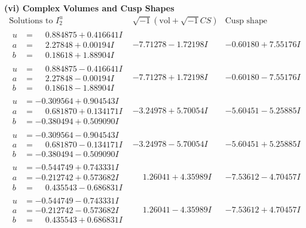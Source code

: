 \documentclass[1p]{elsarticle_modified}
\theoremstyle{definition}
\newcommand{\I}{\sqrt{-1}}
\begin{document}
\newpage\flushleft \textbf{(vi) Complex Volumes and Cusp Shapes}
$$\begin{array}{c|c|c}  
\text{Solutions to }I^u_{2}& \I (\text{vol} + \sqrt{-1}CS) & \text{Cusp shape}\\
 \hline 
\begin{aligned}
u &= \phantom{-}0.884875 + 0.416641 I \\
a &= \phantom{-}2.27848 + 0.00194 I \\
b &= \phantom{-}0.18618 + 1.88904 I\end{aligned}
 & -7.71278 - 1.72198 I & -0.60180 + 7.55176 I \\ \hline\begin{aligned}
u &= \phantom{-}0.884875 - 0.416641 I \\
a &= \phantom{-}2.27848 - 0.00194 I \\
b &= \phantom{-}0.18618 - 1.88904 I\end{aligned}
 & -7.71278 + 1.72198 I & -0.60180 - 7.55176 I \\ \hline\begin{aligned}
u &= -0.309564 + 0.904543 I \\
a &= \phantom{-}0.681870 + 0.134171 I \\
b &= -0.380494 + 0.509090 I\end{aligned}
 & -3.24978 + 5.70054 I & -5.60451 - 5.25885 I \\ \hline\begin{aligned}
u &= -0.309564 - 0.904543 I \\
a &= \phantom{-}0.681870 - 0.134171 I \\
b &= -0.380494 - 0.509090 I\end{aligned}
 & -3.24978 - 5.70054 I & -5.60451 + 5.25885 I \\ \hline\begin{aligned}
u &= -0.544749 + 0.743331 I \\
a &= -0.212742 + 0.573682 I \\
b &= \phantom{-}0.435543 - 0.686831 I\end{aligned}
 & \phantom{-}1.26041 + 4.35989 I & -7.53612 - 4.70457 I \\ \hline\begin{aligned}
u &= -0.544749 - 0.743331 I \\
a &= -0.212742 - 0.573682 I \\
b &= \phantom{-}0.435543 + 0.686831 I\end{aligned}
 & \phantom{-}1.26041 - 4.35989 I & -7.53612 + 4.70457 I \\ \hline\begin{aligned}

\end{aligned}
\end{array}$$
\end{document}
